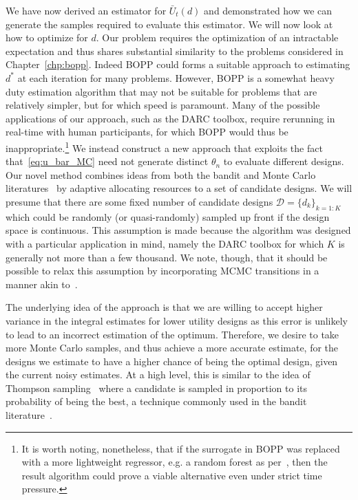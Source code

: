 We have now derived an estimator for $\bar{U}_t(d)$ and demonstrated how we can generate the
samples required to evaluate this estimator.  We will now look at how to optimize for $d$.  
Our problem requires the optimization of an intractable expectation and thus shares substantial
similarity to the problems considered in Chapter~\ref{chp:bopp}.  Indeed BOPP could forms a suitable
approach to estimating $d^*$ at each iteration for many problems.  However, BOPP is a somewhat heavy
duty estimation algorithm that may not be suitable for problems that are relatively simpler,
but for which speed is paramount.  Many of the possible applications of our approach, such
as the DARC toolbox, require rerunning in real-time with human participants, for which BOPP would
thus be inappropriate.\footnote{It is worth noting, nonetheless, that if the surrogate in BOPP
	was replaced with a more lightweight regressor, e.g. a random forest as per~\cite{hutter2011sequential},
	then the result algorithm could prove a viable alternative even under strict time pressure.}
We instead construct a new approach
that exploits the fact that~\eqref{eq:u_bar_MC} need not generate distinct $\theta_n$ to evaluate
different designs.  Our novel method combines ideas from both the bandit and
Monte Carlo literatures~\citep{amzal2006bayesian,neufeld2014adaptive} by adaptive 
allocating resources to a set of candidate designs.  We will presume that there are some fixed number 
of candidate designs $\mathcal{D} = \{d_k\}_{k=1:K}$ which could be randomly (or quasi-randomly)
sampled up front if the design space is continuous.  This assumption is made because the 
algorithm was designed with a particular application in mind, namely the DARC toolbox for which $K$
is generally not more than a few thousand.  We note, though, that it should be possible to relax this
assumption by incorporating MCMC transitions in a manner akin to~\citep{amzal2006bayesian}.

The underlying idea of the approach is that we are willing to accept higher variance in the integral estimates for lower utility designs as this error is unlikely to lead to an incorrect estimation of the optimum.
Therefore, we desire to take more Monte Carlo samples, and thus achieve a more accurate estimate, for the designs we estimate to have a higher chance of being the optimal design, given the current noisy estimates.
At a high level, this is similar  to the idea of Thompson sampling~\citep{thompson1933likelihood} 
where a candidate is sampled in proportion to its probability of being the best, 
a technique commonly used in the bandit literature~\citep{agrawal2012analysis}.

